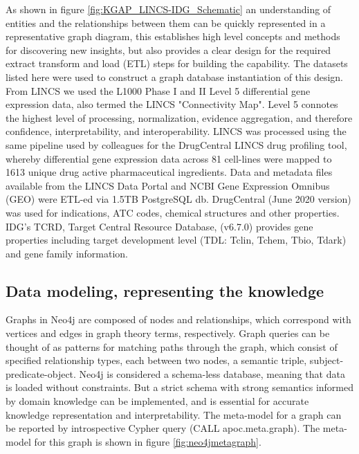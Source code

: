 As shown in figure \ref{fig:KGAP_LINCS-IDG_Schematic} an understanding of entities and the relationships between them can be quickly represented in a representative graph diagram, this establishes high level concepts and methods for discovering new insights, but also provides a clear design for the required extract transform and load (ETL) steps for building the capability.  The datasets listed here were used to construct a graph database instantiation of this design. From LINCS we used the L1000 Phase I and II Level 5 differential gene expression data, also termed the LINCS "Connectivity Map"\cite{Subramanian2017-sx}. Level 5 connotes the highest level of processing, normalization, evidence aggregation, and therefore confidence, interpretability, and interoperability. LINCS was processed using the same pipeline used by colleagues for the DrugCentral LINCS drug profiling tool, whereby differential gene expression data across 81 cell-lines were mapped to 1613 unique drug active pharmaceutical ingredients\cite{Avram2021-wd}.  Data and metadata files available from the LINCS Data Portal and NCBI Gene Expression Omnibus (GEO) were ETL-ed via 1.5TB PostgreSQL db. DrugCentral\cite{Avram2021-wd} (June 2020 version) was used for indications, ATC codes, chemical structures and other properties. IDG's TCRD, Target Central Resource Database\cite{IDG-KMC_Illuminating_the_Druggable_Genome_Knowledge_Management_Center_undated-pn}, (v6.7.0) provides gene properties including target development level (TDL: Tclin, Tchem, Tbio, Tdark) and gene family information.

\subsection{Data modeling, representing the knowledge}

Graphs in Neo4j are composed of nodes and relationships, which correspond with vertices and edges in graph theory terms, respectively. Graph queries can be thought of as patterns for matching paths through the graph, which consist of specified relationship types, each between two nodes, a semantic triple, subject-predicate-object. Neo4j is considered a schema-less database, meaning that data is loaded without constraints. But a strict schema with strong semantics informed by domain knowledge can be implemented, and is essential for accurate knowledge representation and interpretability. The meta-model for a graph can be reported by introspective Cypher query (CALL apoc.meta.graph). The meta-model for this graph is shown in figure \ref{fig:neo4jmetagraph}.


